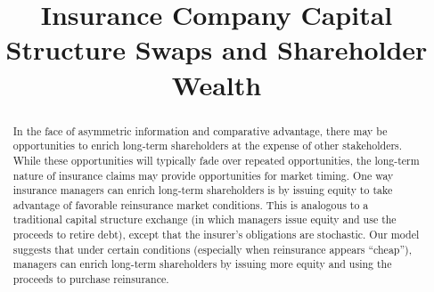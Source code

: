 \documentclass[12pt]{article}
\title{Insurance Company Capital Structure Swaps and Shareholder Wealth}
\begin{document}
\maketitle%

\begin{abstract}
In the face of asymmetric information and comparative advantage, there may be opportunities to enrich long-term shareholders at the expense of other stakeholders. While these opportunities will typically fade over repeated opportunities, the long-term nature of insurance claims may provide opportunities for market timing.  One way insurance managers can enrich long-term shareholders is by issuing equity to take advantage of favorable reinsurance market conditions. This is analogous to a traditional capital structure exchange (in which managers issue equity and use the proceeds to retire debt), except that the insurer's obligations are stochastic. Our model suggests that under certain conditions (especially when reinsurance appears ``cheap''), managers can enrich long-term shareholders by issuing more equity and using the proceeds to purchase reinsurance.

\end{abstract}








\end{document}
